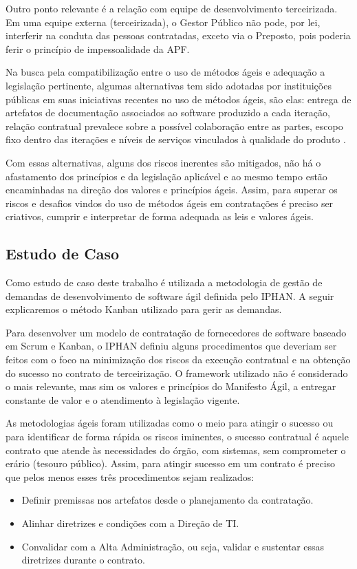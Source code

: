 Outro ponto relevante é a relação com equipe de desenvolvimento terceirizada. Em uma equipe externa (terceirizada), o Gestor Público não pode, por lei, interferir na conduta das pessoas contratadas, exceto via  o Preposto, pois poderia ferir o princípio de impessoalidade da APF.

Na busca pela compatibilização entre o uso de métodos ágeis e adequação a legislação pertinente, algumas alternativas tem sido adotadas por instituições públicas  em suas iniciativas recentes no uso de métodos ágeis, são elas: entrega de artefatos de documentação associados ao software produzido a cada iteração, relação contratual prevalece sobre a possível colaboração entre as partes, escopo fixo dentro das iterações e níveis de serviços vinculados à qualidade do produto   \cite{ruas}. 

Com essas alternativas, alguns dos riscos inerentes são mitigados, não há o afastamento dos princípios e da legislação aplicável e ao mesmo tempo estão encaminhadas na direção dos valores e princípios ágeis. Assim, para superar os riscos e desafios vindos do uso de métodos ágeis em contratações é preciso ser criativos, cumprir e interpretar de forma adequada as leis e valores ágeis. 

\subsection[Estudo de Caso]{Estudo de Caso}

Como estudo de caso deste trabalho é utilizada a metodologia de gestão de demandas de desenvolvimento de software ágil definida pelo IPHAN. A seguir explicaremos o método Kanban utilizado para gerir as demandas.

Para desenvolver um modelo de contratação de fornecedores de software baseado em Scrum e Kanban, o IPHAN definiu alguns procedimentos que deveriam ser feitos com o foco na minimização dos riscos da execução contratual e na obtenção do sucesso no contrato de terceirização. O framework utilizado não é considerado o mais relevante, mas sim os valores e princípios do Manifesto Ágil, a entregar constante de valor e o atendimento à legislação vigente. 

As metodologias ágeis foram utilizadas como o meio para atingir o sucesso ou para identificar de forma rápida os riscos iminentes, o sucesso contratual é aquele contrato que atende às necessidades do órgão, com sistemas, sem comprometer o erário (tesouro público). Assim, para atingir sucesso em um contrato é preciso que pelos menos esses três procedimentos sejam realizados:
\begin{itemize}
\item Definir premissas nos artefatos desde o planejamento da contratação.
\item Alinhar diretrizes e condições com a Direção de TI.
\item Convalidar com a Alta Administração, ou seja, validar e sustentar essas diretrizes durante o contrato.
\end{itemize}

